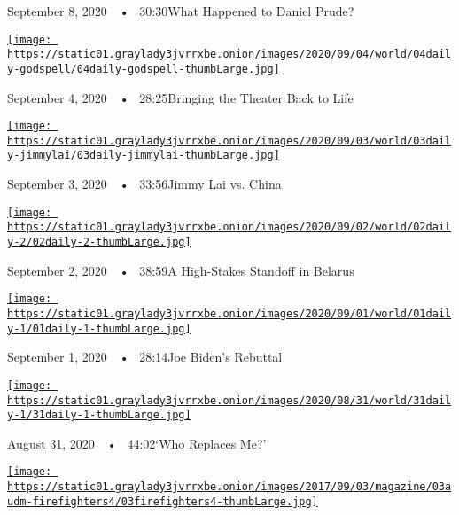 September 8, 2020~~•~ 30:30What Happened to Daniel Prude?

\href{https://www.nytimes3xbfgragh.onion/2020/09/04/podcasts/the-daily/Godspell-theater-coronavirus.html?action=click\&module=audio-series-bar\&region=header\&pgtype=Article}{\texttt{[image: https://static01.graylady3jvrrxbe.onion/images/2020/09/04/world/04daily-godspell/04daily-godspell-thumbLarge.jpg]}}

September 4, 2020~~•~ 28:25Bringing the Theater Back to Life

\href{https://www.nytimes3xbfgragh.onion/2020/09/03/podcasts/the-daily/hong-kong-china-jimmy-lai.html?action=click\&module=audio-series-bar\&region=header\&pgtype=Article}{\texttt{[image: https://static01.graylady3jvrrxbe.onion/images/2020/09/03/world/03daily-jimmylai/03daily-jimmylai-thumbLarge.jpg]}}

September 3, 2020~~•~ 33:56Jimmy Lai vs. China

\href{https://www.nytimes3xbfgragh.onion/2020/09/02/podcasts/the-daily/belarus-protests-lukashenko.html?action=click\&module=audio-series-bar\&region=header\&pgtype=Article}{\texttt{[image: https://static01.graylady3jvrrxbe.onion/images/2020/09/02/world/02daily-2/02daily-2-thumbLarge.jpg]}}

September 2, 2020~~•~ 38:59A High-Stakes Standoff in Belarus

\href{https://www.nytimes3xbfgragh.onion/2020/09/01/podcasts/the-daily/joe-biden-protests-trump.html?action=click\&module=audio-series-bar\&region=header\&pgtype=Article}{\texttt{[image: https://static01.graylady3jvrrxbe.onion/images/2020/09/01/world/01daily-1/01daily-1-thumbLarge.jpg]}}

September 1, 2020~~•~ 28:14Joe Biden's Rebuttal

\href{https://www.nytimes3xbfgragh.onion/2020/08/31/podcasts/the-daily/flint-michigan-police-officer.html?action=click\&module=audio-series-bar\&region=header\&pgtype=Article}{\texttt{[image: https://static01.graylady3jvrrxbe.onion/images/2020/08/31/world/31daily-1/31daily-1-thumbLarge.jpg]}}

August 31, 2020~~•~ 44:02`Who Replaces Me?'

\href{https://www.nytimes3xbfgragh.onion/2020/08/30/podcasts/the-daily/california-wildfires-prisoners.html?action=click\&module=audio-series-bar\&region=header\&pgtype=Article}{\texttt{[image: https://static01.graylady3jvrrxbe.onion/images/2017/09/03/magazine/03audm-firefighters4/03firefighters4-thumbLarge.jpg]}}

